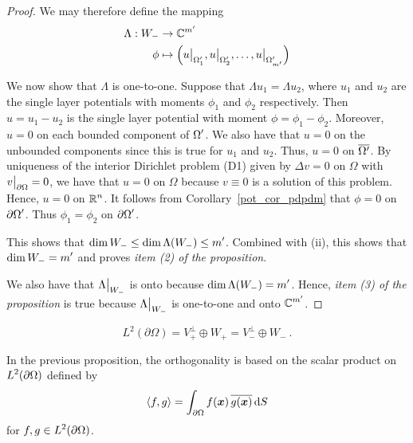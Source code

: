 \begin{proof}
We may therefore define the mapping
\begin{align*}
\Lambda : W_- & \rightarrow \mathbb{C}^{m^{\prime}} \\
\phi &\mapsto \left( u\big|_{\Omega^{\prime}_1}, u\big|_{\Omega^{\prime}_2},
\ldots, u\big|_{\Omega^{\prime}_{m^{\prime}}}\right)
\end{align*}

We now show that $\Lambda$ is one-to-one.  Suppose that
$\Lambda u_1 = \Lambda u_2$, where $u_1$ and $u_2$ are the single
layer potentials with moments $\phi_1$ and $\phi_2$ respectively.
Then $u=u_1-u_2$ is the single layer potential with moment
$\phi = \phi_1-\phi_2$.  Moreover, $u = 0$ on each bounded component of
$\displaystyle \Omega^{\prime}$.  We also have that $u = 0$ on the unbounded
components since this is true for $u_1$ and $u_2$.   Thus,
$u=0$ on $\displaystyle \overline{\Omega^{\prime}}$.
By uniqueness of the interior Dirichlet problem (D1) given by
$\Delta v =0$ on $\Omega$ with $\displaystyle v\big|_{\partial \Omega}=0$,
we have that $u=0$ on $\Omega$ because $v\equiv 0$ is a solution of this
problem.   Hence, $u = 0$ on $\displaystyle \mathbb{R}^n$.  It follows from
Corollary~\ref{pot_cor_pdpdm} that $\phi =0$ on
$\displaystyle \partial \Omega^{\prime}$.
Thus $\phi_1=\phi_2$ on $\displaystyle \partial \Omega^{\prime}$.

This shows that
$\displaystyle \dim W_- \leq \dim \Lambda(W_-) \leq m^{\prime}$.  Combined
with (ii), this shows that $\displaystyle \dim W_- = m^{\prime}$ and proves
{\em item (2) of the proposition}.

We also have that $\displaystyle \Lambda\big|_{W_-}$ is onto because
$\displaystyle \dim \Lambda(W_-) = m^{\prime}$.  Hence, 
{\em item (3) of the proposition} is true because
$\displaystyle \Lambda\big|_{W_-}$ is one-to-one and onto
$\displaystyle \mathbb{C}^{m^{\prime}}$.
\end{proof}

\begin{prop} \label{pot_L2_split1}
\[
L^2(\partial \Omega) = V_+^\perp \oplus W_+ = V_-^\perp \oplus W_- \ .
\]
\end{prop}

In the previous proposition, the orthogonality is based on the scalar
product on $\displaystyle L^2(\partial \Omega)$ defined by
\[
\left\langle{f} , {g}\right\rangle = \int_{\partial \Omega} f({\bm{x}})\,\overline{g({\bm{x}})} \,\mathrm{d}{S}
\]
for $\displaystyle f,g \in L^2(\partial \Omega)$.

